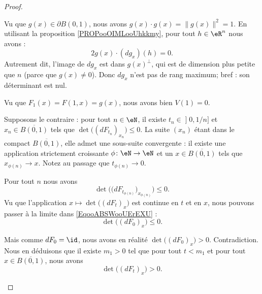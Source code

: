 \begin{proof}
\begin{subproof}
		\spitem[\( V(1)=0\)]
		Vu que \( g(x)\in \partial B(0,1)\), nous avons \( g(x)\cdot g(x)= \| g(x) \|^2=1\). En utilisant la proposition \ref{PROPooOIMLooUhkkmy}, pour tout \( h\in \eR^n\) nous avons :
		\begin{equation}
			2g(x)\cdot (dg_x)(h)=0.
		\end{equation}
		Autrement dit, l'image de \( dg_x\) est dans \( g(x)^{\perp}\), qui est de dimension plus petite que \( n\) (parce que \( g(x)\neq 0\)). Donc \( dg_x\) n'est pas de rang maximum; bref : son déterminant est nul.

		Vu que \( F_1(x)=F(1,x)=g(x)\), nous avons bien \( V(1)=0\).


		Supposons le contraire : pour tout \( n\in \eN\), il existe \( t_n\in \mathopen] 0,1/n\mathclose]\) et \( x_n\in\overline{B(0,1)}\) tels que \( \det\big( (dF_{t_n})_{x_n} \big)\leq 0\). La suite \( (x_n)\) étant dans le compact \( \overline{B(0,1)}\), elle admet une sous-suite convergente : il existe une application strictement croissante \(\phi \colon \eN\to \eN  \) et un \( x\in\overline{B(0,1)}\) tels que \( x_{\phi(n)}\to x \). Notez au passage que \( t_{\phi(n)}\to 0\).

		Pour tout \( n\) nous avons
		\begin{equation}		\label{EqooABSWooUErEXU}
			\det\Big( \big( dF_{t_{\phi(n)}} \big)_{x_{\phi(n)}} \Big)\leq 0.
		\end{equation}
		Vu que l'application \( x\mapsto \det\big( (dF_t)_x \big)\) est continue en \( t\) et en \( x\), nous pouvons passer à la limite dans \eqref{EqooABSWooUErEXU} :
		\begin{equation}
			\det\Big( (dF_0)_x \Big)\leq 0.
		\end{equation}

		Mais comme \( dF_0=\id\), nous avons en réalité \( \det\big( (dF_0)_x \big)>0\). Contradiction. Nous en déduisons que il existe \( m_1>0\) tel que pour tout \( t<m_1\) et pour tout \( x\in\overline{B(0,1)}\), nous avons
		\begin{equation}
			\det\Big( (dF_t)_x \Big)>0.
		\end{equation}



\end{subproof}
\end{proof}
